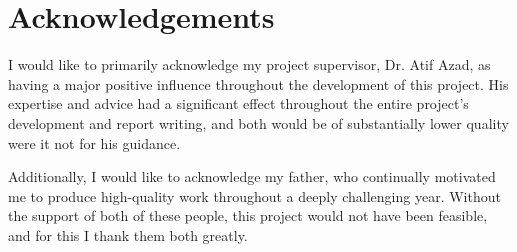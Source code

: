 \documentclass[12pt]{report}
\newcommand{\para}{\vspace{7pt}\noindent}
\begin{document}
\setcounter{page}{-4}

\chapter*{Acknowledgements}
\thispagestyle{empty}
I would like to primarily acknowledge my project supervisor, Dr. Atif Azad, as having a major positive 
influence throughout the development of this project. His expertise and advice had a significant 
effect throughout the entire project's development and report writing, and both would be of substantially 
lower quality were it not for his guidance.

\para Additionally, I would like to acknowledge my father, who continually motivated me to produce high-quality 
work throughout a deeply challenging year. Without the support of both of these people, this project 
would not have been feasible, and for this I thank them both greatly.
\end{document}

